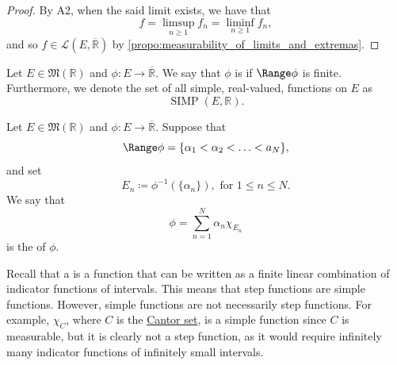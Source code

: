 \documentclass[notoc,notitlepage]{tufte-book}
\DeclareMathOperator{\SIMP}{SIMP}
\begin{document}
\begin{proof}
  By A2, when the said limit exists, we have that
  \begin{equation*}
    f = \limsup_{n \geq 1} f_n = \liminf_{n \geq 1} f_n,
  \end{equation*}
  and so $f \in \mathcal{L}(E, \overline{\mathbb{R}})$ by
  \cref{propo:measurability_of_limits_and_extremas}.
\end{proof}

\begin{defn}\label{defn:simple_functions}
  Let $E \in \mathfrak{M}(\mathbb{R})$ and $\phi : E \to \overline{\mathbb{R}}$.
  We say that $\phi$ is  if $\Range \phi$ is finite.
  Furthermore, we denote the set of all simple, real-valued, 
  functions on $E$ as
  \begin{equation*}
    \SIMP(E, \mathbb{R}).
  \end{equation*}
\end{defn}

\begin{defn}\label{defn:standard_form}
  Let $E \in \mathfrak{M}(\mathbb{R})$ and $\phi : E \to \overline{\mathbb{R}}$.
  Suppose that
  \begin{equation*}
    \Range \phi = \{ \alpha_1 < \alpha_2 < \hdots < a_N \},
  \end{equation*}
  and set
  \begin{equation*}
    E_n \coloneqq \phi^{-1}(\{\alpha_n\}), \text{ for } 1 \leq n \leq N.
  \end{equation*}
  We say that
  \begin{equation*}
    \phi = \sum_{n=1}^{N} \alpha_n \chi_{E_n}
  \end{equation*}
  is the  of $\phi$.
\end{defn}

\begin{warning}\label{warning:step_functions_are_simple_but_the_converse_is_false}
  Recall that a  is a function
  that can be written as a finite linear combination of indicator functions
  of intervals.
  This means that step functions are simple functions.
  However, simple functions are not necessarily step functions.
  For example, $\chi_C$, where $C$ is the \hyperref[eg:cantor_set]{Cantor set},
  is a simple function since $C$ is measurable,
  but it is clearly not a step function, as it would require infinitely many
  indicator functions of infinitely small intervals.
\end{warning}
\end{document}
